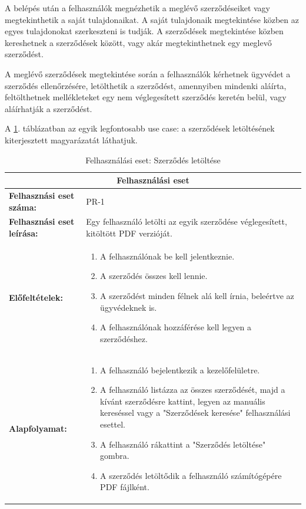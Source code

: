 A belépés után a felhasználók megnézhetik a meglévő szerződéseiket vagy megtekinthetik a saját tulajdonaikat. A saját tulajdonaik megtekintése közben az egyes tulajdonokat szerkeszteni is tudják. A szerződések megtekintése közben kereshetnek a szerződések között, vagy akár megtekinthetnek egy meglevő szerződést.

A meglévő szerződések megtekintése során a felhasználók kérhetnek ügyvédet a szerződés ellenőrzésére, letölthetik a szerződést, amennyiben mindenki aláírta, feltölthetnek mellékleteket egy nem véglegesített szerződés keretén belül, vagy aláírhatják a szerződést.

A \ref{software:contractdownload}. táblázatban az egyik legfontosabb use case: a szerződések letöltésének kiterjesztett magyarázatát láthatjuk.

\begin{longtable}{|p{}|p{}|}
\caption{Felhasználási eset: Szerződés letöltése}
\label{software:contractdownload}
\hline
\multicolumn{2}{|c|}{\textbf{Felhasználási eset}} \\
\hline
\textbf{Felhasznási eset száma:} & PR-1 \\
\hline
\textbf{Felhasznási eset leírása:} & Egy felhasználó letölti az egyik szerződése véglegesített, kitöltött PDF verzióját. \\
\hline
\textbf{Előfeltételek:} & 
\begin{enumerate}[itemsep=0pt,parsep=0pt,topsep=0pt,partopsep=0pt]
    \item A felhasználónak be kell jelentkeznie.
    \item A szerződés összes  kell lennie.
    \item A szerződést minden félnek alá kell írnia, beleértve az ügyvédeknek is.
    \item A felhasználónak hozzáférése kell legyen a szerződéshez.
\end{enumerate} \\
\hline
\textbf{Alapfolyamat:} & 
\begin{enumerate}[itemsep=0pt,parsep=0pt,topsep=0pt,partopsep=0pt]
    \item A felhasználó bejelentkezik a kezelőfelületre.
    \item A felhasználó listázza az összes szerződését, majd a kívánt szerződésre kattint, legyen az manuális kereséssel vagy a "Szerződések keresése" felhasználási esettel.
    \item A felhasználó rákattint a "Szerződés letöltése" gombra.
    \item A szerződés letöltődik a felhasználó számítógépére PDF fájlként.
\end{enumerate} \\
\hline
\end{longtable}

